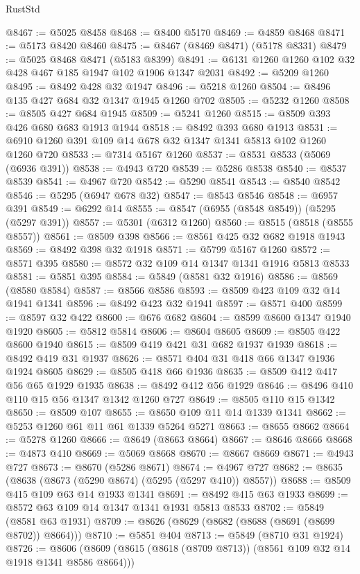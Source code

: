 \begin{lexlean}{RustStd}
\begin{coremodule}
@8467 := @5025 @8458
@8468 := @8400 @5170
@8469 := @4859 @8468
@8471 := @5173 @8420 @8460
@8475 := @8467 (@8469 @8471) (@5178 @8331)
@8479 := @5025 @8468 @8471 (@5183 @8399)
@8491 := @6131 @1260 @1260 @102 @32 @428 @467 @185 @1947 @102 @1906 @1347 @2031
@8492 := @5209 @1260
@8495 := @8492 @428 @32 @1947
@8496 := @5218 @1260
@8504 := @8496 @135 @427 @684 @32 @1347 @1945 @1260 @702
@8505 := @5232 @1260
@8508 := @8505 @427 @684 @1945
@8509 := @5241 @1260
@8515 := @8509 @393 @426 @680 @683 @1913 @1944
@8518 := @8492 @393 @680 @1913
@8531 := @6910 @1260 @391 @109 @14 @678 @32 @1347 @1341 @5813 @102 @1260 @1260 @720
@8533 := @7314 @5167 @1260
@8537 := @8531 @8533 (@5069 (@6936 @391))
@8538 := @4943 @720
@8539 := @5286 @8538
@8540 := @8537 @8539
@8541 := @4967 @720
@8542 := @5290 @8541
@8543 := @8540 @8542
@8546 := @5295 (@6947 @678 @32)
@8547 := @8543 @8546
@8548 := @6957 @391
@8549 := @6292 @14
@8555 := @8547 (@6955 (@8548 @8549)) (@5295 (@5297 @391))
@8557 := @5301 (@6312 @1260)
@8560 := @8515 (@8518 (@8555 @8557))
@8561 := @8509 @398
@8566 := @8561 @425 @32 @682 @1918 @1943
@8569 := @8492 @398 @32 @1918
@8571 := @5799 @5167 @1260
@8572 := @8571 @395
@8580 := @8572 @32 @109 @14 @1347 @1341 @1916 @5813 @8533
@8581 := @5851 @395
@8584 := @5849 (@8581 @32 @1916)
@8586 := @8569 (@8580 @8584)
@8587 := @8566 @8586
@8593 := @8509 @423 @109 @32 @14 @1941 @1341
@8596 := @8492 @423 @32 @1941
@8597 := @8571 @400
@8599 := @8597 @32 @422
@8600 := @676 @682
@8604 := @8599 @8600 @1347 @1940 @1920
@8605 := @5812 @5814
@8606 := @8604 @8605
@8609 := @8505 @422 @8600 @1940
@8615 := @8509 @419 @421 @31 @682 @1937 @1939
@8618 := @8492 @419 @31 @1937
@8626 := @8571 @404 @31 @418 @66 @1347 @1936 @1924 @8605
@8629 := @8505 @418 @66 @1936
@8635 := @8509 @412 @417 @56 @65 @1929 @1935
@8638 := @8492 @412 @56 @1929
@8646 := @8496 @410 @110 @15 @56 @1347 @1342 @1260 @727
@8649 := @8505 @110 @15 @1342
@8650 := @8509 @107
@8655 := @8650 @109 @11 @14 @1339 @1341
@8662 := @5253 @1260 @61 @11 @61 @1339 @5264 @5271
@8663 := @8655 @8662
@8664 := @5278 @1260
@8666 := @8649 (@8663 @8664)
@8667 := @8646 @8666
@8668 := @4873 @410
@8669 := @5069 @8668
@8670 := @8667 @8669
@8671 := @4943 @727
@8673 := @8670 (@5286 @8671)
@8674 := @4967 @727
@8682 := @8635 (@8638 (@8673 (@5290 @8674) (@5295 (@5297 @410)) @8557))
@8688 := @8509 @415 @109 @63 @14 @1933 @1341
@8691 := @8492 @415 @63 @1933
@8699 := @8572 @63 @109 @14 @1347 @1341 @1931 @5813 @8533
@8702 := @5849 (@8581 @63 @1931)
@8709 := @8626 (@8629 (@8682 (@8688 (@8691 (@8699 @8702)) @8664)))
@8710 := @5851 @404
@8713 := @5849 (@8710 @31 @1924)
@8726 := @8606 (@8609 (@8615 (@8618 (@8709 @8713)) (@8561 @109 @32 @14 @1918 @1341 @8586 @8664)))

\end{coremodule}
\end{lexlean}
